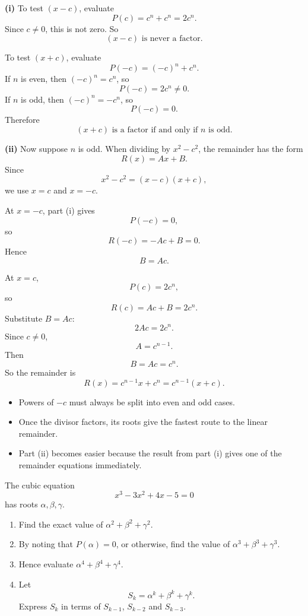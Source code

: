 \begin{solution}
\textbf{(i)} To test $(x-c)$, evaluate
\[
P(c)=c^n+c^n=2c^n.
\]
Since $c\ne0$, this is not zero. So
\[
\boxed{(x-c)\text{ is never a factor}.}
\]

To test $(x+c)$, evaluate
\[
P(-c)=(-c)^n+c^n.
\]
If $n$ is even, then $(-c)^n=c^n$, so
\[
P(-c)=2c^n\ne0.
\]
If $n$ is odd, then $(-c)^n=-c^n$, so
\[
P(-c)=0.
\]
Therefore
\[
\boxed{(x+c)\text{ is a factor if and only if }n\text{ is odd}.}
\]

\textbf{(ii)} Now suppose $n$ is odd. When dividing by $x^2-c^2$, the remainder has the form
\[
R(x)=Ax+B.
\]
Since
\[
x^2-c^2=(x-c)(x+c),
\]
we use $x=c$ and $x=-c$.

At $x=-c$, part (i) gives
\[
P(-c)=0,
\]
so
\[
R(-c)=-Ac+B=0.
\]
Hence
\[
B=Ac.
\]

At $x=c$,
\[
P(c)=2c^n,
\]
so
\[
R(c)=Ac+B=2c^n.
\]
Substitute $B=Ac$:
\[
2Ac=2c^n.
\]
Since $c\ne0$,
\[
A=c^{n-1}.
\]
Then
\[
B=Ac=c^n.
\]
So the remainder is
\[
\boxed{R(x)=c^{n-1}x+c^n=c^{n-1}(x+c).}
\]
\end{solution}

\begin{takeaways}
\begin{itemize}[leftmargin=*]
\item Powers of $-c$ must always be split into even and odd cases.
\item Once the divisor factors, its roots give the fastest route to the linear remainder.
\item Part (ii) becomes easier because the result from part (i) gives one of the remainder equations immediately.
\end{itemize}
\end{takeaways}

\begin{problem}
The cubic equation
\[
x^3-3x^2+4x-5=0
\]
has roots $\alpha,\beta,\gamma$.
\begin{enumerate}[label=(\roman*)]
\item Find the exact value of $\alpha^2+\beta^2+\gamma^2$.
\item By noting that $P(\alpha)=0$, or otherwise, find the value of $\alpha^3+\beta^3+\gamma^3$.
\item Hence evaluate $\alpha^4+\beta^4+\gamma^4$.
\item Let
\[
S_k=\alpha^k+\beta^k+\gamma^k.
\]
Express $S_k$ in terms of $S_{k-1}$, $S_{k-2}$ and $S_{k-3}$.
\end{enumerate}
\end{problem}

